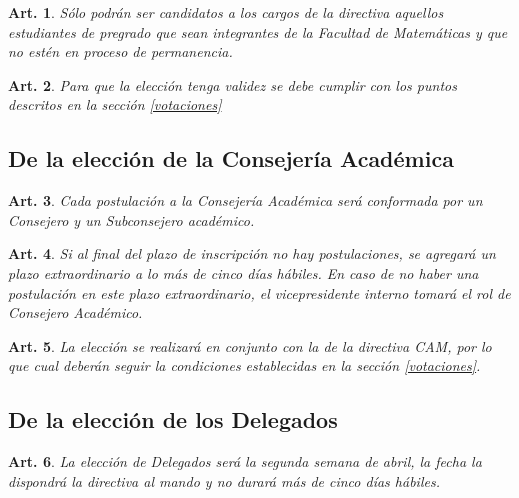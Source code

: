 \documentclass[letterpaper,11pt]{article}
\theoremstyle{plain}
\newtheorem{art}{Art.} %
\begin{document}
\begin{art}\label{eleccionesCAMCandidatos}
	Sólo podrán ser candidatos a los cargos de la directiva aquellos estudiantes de pregrado que sean integrantes de la Facultad de Matemáticas y que no estén en proceso de permanencia. %
\end{art}

\begin{art}\label{eleccionesCAMVotacion}
	Para que la elección tenga validez se debe cumplir con los puntos descritos en la sección \ref{votaciones}
\end{art}

\subsection{De la elección de la Consejería Académica}\label{eleccionesConsejeria}

\begin{art}\label{eleccionesConsejeriaLista}
	Cada postulación a la Consejería Académica será conformada por un Consejero y un Subconsejero académico.
\end{art}

\begin{art}\label{eleccionesConsejeriaFalla}
	Si al final del plazo de inscripción no hay postulaciones, se agregará un plazo extraordinario a lo más de cinco días hábiles. En caso de no haber una postulación en este plazo extraordinario, el vicepresidente interno tomará el rol de Consejero Académico.
\end{art}

\begin{art}\label{eleccionesConsejeriaVotacion}
	La elección se realizará en conjunto con la de la directiva CAM, por lo que cual deberán seguir la condiciones establecidas en la sección \ref{votaciones}.
\end{art}

\subsection{De la elección de los Delegados}\label{eleccionesDelegados}

\begin{art}\label{eleccionesDelegadosFecha}
	La elección de Delegados será la segunda semana de abril, la fecha la dispondrá la directiva al mando y no durará más de cinco días hábiles.
\end{art}
\end{document}
